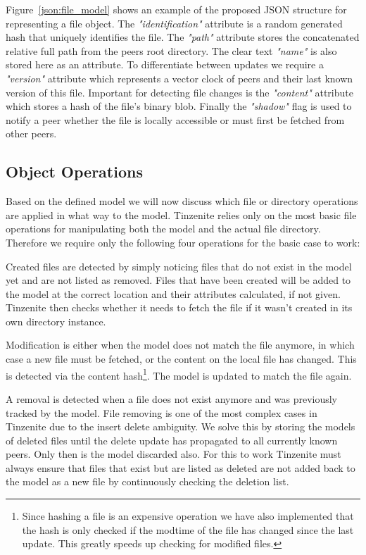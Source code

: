 Figure~\ref{json:file_model} shows an example of the proposed JSON structure for representing a file object.
The \textit{"identification"} attribute is a random generated hash that uniquely identifies the file.
The \textit{"path"} attribute stores the concatenated relative full path from the peers root directory.
The clear text \textit{"name"} is also stored here as an attribute.
To differentiate between updates we require a \textit{"version"} attribute which represents a vector clock of peers and their last known version of this file.
Important for detecting file changes is the \textit{"content"} attribute which stores a hash of the file's binary blob.
Finally the \textit{"shadow"} flag is used to notify a peer whether the file is locally accessible or must first be fetched from other peers.

\subsection{Object Operations}
\label{sub:Object Operations}

Based on the defined model we will now discuss which file or directory operations are applied in what way to the model.
Tinzenite relies only on the most basic file operations for manipulating both the model and the actual file directory.
Therefore we require only the following four operations for the basic case to work:

\begin{description}[leftmargin=5em,style=nextline,noitemsep,nolistsep]
    \item[Create]
        Created files are detected by simply noticing files that do not exist in the model yet and are not listed as removed.
        Files that have been created will be added to the model at the correct location and their attributes calculated, if not given.
        Tinzenite then checks whether it needs to fetch the file if it wasn't created in its own directory instance.
    \item[Modify]
        Modification is either when the model does not match the file anymore, in which case a new file must be fetched, or the content on the local file has changed.
        This is detected via the content hash\footnote{Since hashing a file is an expensive operation we have also implemented that the hash is only checked if the modtime of the file has changed since the last update. This greatly speeds up checking for modified files.}.
        The model is updated to match the file again.
    \item[Remove]
        A removal is detected when a file does not exist anymore and was previously tracked by the model.
        File removing is one of the most complex cases in Tinzenite due to the insert delete ambiguity.
        We solve this by storing the models of deleted files until the delete update has propagated to all currently known peers.
        Only then is the model discarded also.
        For this to work Tinzenite must always ensure that files that exist but are listed as deleted are not added back to the model as a new file by continuously checking the deletion list.
\end{description}

